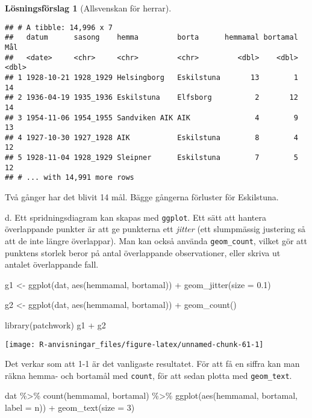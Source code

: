 \documentclass[
]{book}
\newenvironment{Shaded}{\begin{snugshade}}{\end{snugshade}}
\newcommand{\AttributeTok}[1]{\textcolor[rgb]{0.77,0.63,0.00}{#1}}
\newcommand{\DecValTok}[1]{\textcolor[rgb]{0.00,0.00,0.81}{#1}}
\newcommand{\FloatTok}[1]{\textcolor[rgb]{0.00,0.00,0.81}{#1}}
\newcommand{\FunctionTok}[1]{\textcolor[rgb]{0.00,0.00,0.00}{#1}}
\newcommand{\NormalTok}[1]{#1}
\newcommand{\OtherTok}[1]{\textcolor[rgb]{0.56,0.35,0.01}{#1}}
\newcommand{\SpecialCharTok}[1]{\textcolor[rgb]{0.00,0.00,0.00}{#1}}
\theoremstyle{definition}
\theoremstyle{definition}
\theoremstyle{definition}
\theoremstyle{definition}
\newtheorem{hypothesis}{Lösningsförslag}[chapter]
\theoremstyle{remark}
\begin{document}
\begin{hypothesis}[Allsvenskan för herrar]
\begin{verbatim}
## # A tibble: 14,996 x 7
##   datum      sasong    hemma         borta      hemmamal bortamal   Mål
##   <date>     <chr>     <chr>         <chr>         <dbl>    <dbl> <dbl>
## 1 1928-10-21 1928_1929 Helsingborg   Eskilstuna       13        1    14
## 2 1936-04-19 1935_1936 Eskilstuna    Elfsborg          2       12    14
## 3 1954-11-06 1954_1955 Sandviken AIK AIK               4        9    13
## 4 1927-10-30 1927_1928 AIK           Eskilstuna        8        4    12
## 5 1928-11-04 1928_1929 Sleipner      Eskilstuna        7        5    12
## # ... with 14,991 more rows
\end{verbatim}

Två gånger har det blivit 14 mål. Bägge gångerna förluster för Eskilstuna.

d. Ett spridningsdiagram kan skapas med \texttt{ggplot}. Ett sätt att hantera överlappande punkter är att ge punkterna ett \emph{jitter} (ett slumpmässig justering så att de inte längre överlappar). Man kan också använda \texttt{geom\_count}, vilket gör att punktens storlek beror på antal överlappande observationer, eller skriva ut antalet överlappande fall.

\begin{Shaded}
\begin{Highlighting}[]
\NormalTok{g1 }\OtherTok{\textless{}{-}} \FunctionTok{ggplot}\NormalTok{(dat, }\FunctionTok{aes}\NormalTok{(hemmamal, bortamal)) }\SpecialCharTok{+}
  \FunctionTok{geom\_jitter}\NormalTok{(}\AttributeTok{size =} \FloatTok{0.1}\NormalTok{)}

\NormalTok{g2 }\OtherTok{\textless{}{-}} \FunctionTok{ggplot}\NormalTok{(dat, }\FunctionTok{aes}\NormalTok{(hemmamal, bortamal)) }\SpecialCharTok{+}
  \FunctionTok{geom\_count}\NormalTok{()}

\FunctionTok{library}\NormalTok{(patchwork)}
\NormalTok{g1 }\SpecialCharTok{+}\NormalTok{ g2}
\end{Highlighting}
\end{Shaded}

\begin{center}\texttt{[image: R-anvisningar\_files/figure-latex/unnamed-chunk-61-1]} \end{center}

Det verkar som att 1-1 är det vanligaste resultatet. För att få en siffra kan man räkna hemma- och bortamål med \texttt{count}, för att sedan plotta med \texttt{geom\_text}.

\begin{Shaded}
\begin{Highlighting}[]
\NormalTok{dat }\SpecialCharTok{\%\textgreater{}\%} 
  \FunctionTok{count}\NormalTok{(hemmamal, bortamal) }\SpecialCharTok{\%\textgreater{}\%} 
  \FunctionTok{ggplot}\NormalTok{(}\FunctionTok{aes}\NormalTok{(hemmamal, bortamal, }\AttributeTok{label =}\NormalTok{ n)) }\SpecialCharTok{+}
  \FunctionTok{geom\_text}\NormalTok{(}\AttributeTok{size =} \DecValTok{3}\NormalTok{)}
\end{Highlighting}
\end{Shaded}


\end{hypothesis}
\end{document}
